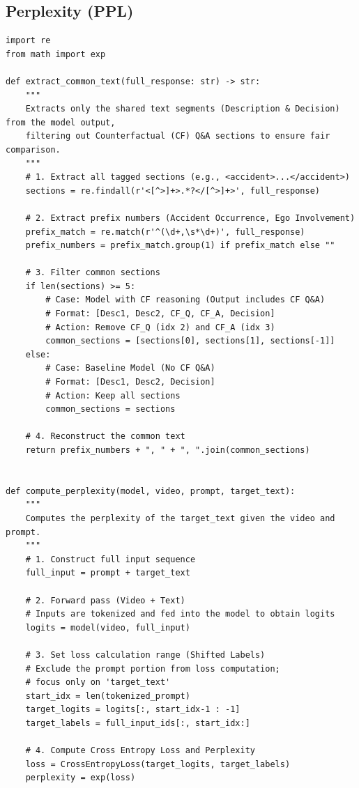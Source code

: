 \documentclass{article}
\begin{document}
\subsection{Perplexity (PPL)}
\begin{lstlisting}[label={lst:perplexity}]
import re
from math import exp

def extract_common_text(full_response: str) -> str:
    """
    Extracts only the shared text segments (Description & Decision) from the model output,
    filtering out Counterfactual (CF) Q&A sections to ensure fair comparison.
    """
    # 1. Extract all tagged sections (e.g., <accident>...</accident>)
    sections = re.findall(r'<[^>]+>.*?</[^>]+>', full_response)
    
    # 2. Extract prefix numbers (Accident Occurrence, Ego Involvement)
    prefix_match = re.match(r'^(\d+,\s*\d+)', full_response)
    prefix_numbers = prefix_match.group(1) if prefix_match else ""

    # 3. Filter common sections
    if len(sections) >= 5: 
        # Case: Model with CF reasoning (Output includes CF Q&A)
        # Format: [Desc1, Desc2, CF_Q, CF_A, Decision]
        # Action: Remove CF_Q (idx 2) and CF_A (idx 3)
        common_sections = [sections[0], sections[1], sections[-1]]
    else:
        # Case: Baseline Model (No CF Q&A)
        # Format: [Desc1, Desc2, Decision]
        # Action: Keep all sections
        common_sections = sections

    # 4. Reconstruct the common text
    return prefix_numbers + ", " + ", ".join(common_sections)


def compute_perplexity(model, video, prompt, target_text):
    """
    Computes the perplexity of the target_text given the video and prompt.
    """
    # 1. Construct full input sequence
    full_input = prompt + target_text
    
    # 2. Forward pass (Video + Text)
    # Inputs are tokenized and fed into the model to obtain logits
    logits = model(video, full_input)
    
    # 3. Set loss calculation range (Shifted Labels)
    # Exclude the prompt portion from loss computation; 
    # focus only on 'target_text'
    start_idx = len(tokenized_prompt)
    target_logits = logits[:, start_idx-1 : -1]
    target_labels = full_input_ids[:, start_idx:]
    
    # 4. Compute Cross Entropy Loss and Perplexity
    loss = CrossEntropyLoss(target_logits, target_labels)
    perplexity = exp(loss)
    

\end{lstlisting}
\end{document}
